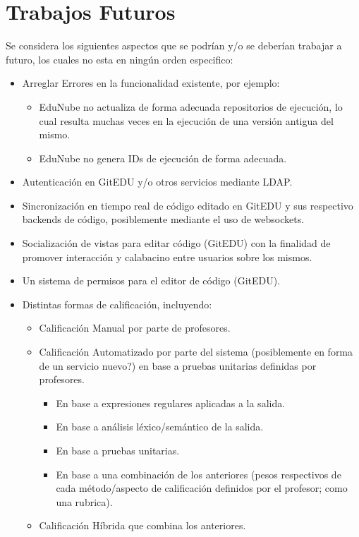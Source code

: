 \section{Trabajos Futuros}
Se considera los siguientes aspectos que se podrían y/o se deberían trabajar a futuro, los cuales no esta en ningún orden especifico:
\begin{itemize}
	\item Arreglar Errores en la funcionalidad existente, por ejemplo:
    \begin{itemize}
    	\item EduNube no actualiza de forma adecuada repositorios de ejecución, lo cual resulta muchas veces en la ejecución de una versión antigua del mismo.
        \item EduNube no genera IDs de ejecución de forma adecuada.
    \end{itemize}
    \item Autenticación en GitEDU y/o otros servicios mediante LDAP.
    \item Sincronización en tiempo real de código editado en GitEDU y sus respectivo backends de código, posiblemente  mediante el uso de websockets.
    \item Socialización de vistas para editar código (GitEDU) con la finalidad de promover interacción y calabacino entre usuarios sobre los mismos.
    \item Un sistema de permisos para el editor de código (GitEDU).
    \item Distintas formas de calificación, incluyendo:
    \begin{itemize}
    	\item Calificación Manual por parte de profesores.
        \item Calificación Automatizado por parte del sistema (posiblemente en forma de un servicio nuevo?) en base a pruebas unitarias definidas por profesores.
        \begin{itemize}
        	\item En base a expresiones regulares aplicadas a la salida.
            \item En base a análisis léxico/semántico de la salida.
            \item En base a pruebas unitarias.
            \item En base a una combinación de los anteriores (pesos respectivos de cada método/aspecto de calificación definidos por el profesor; como una rubrica).
        \end{itemize}
        \item Calificación Híbrida que combina los anteriores.

\end{itemize}
\end{itemize}
